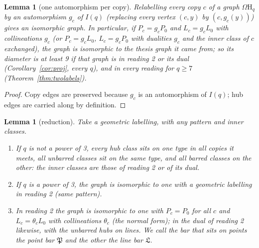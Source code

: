 \documentclass[11pt]{amsart}
\newtheorem{lemma}[theorem]{Lemma}
\theoremstyle{definition}
\theoremstyle{remark}
\numberwithin{equation}{section}
\newcommand{\Om}{\Omega\mathrm H}
\begin{document}
\begin{lemma}[one automorphism per copy]\label{lem:relabel}
Relabelling every copy $c$ of a graph $\Om_q$ by an automorphism $g_c$ of $I(q)$ (replacing every vertex $(c,y)$ by
$(c,g_c(y))$) gives an isomorphic graph. In particular, if $P_c=g_cP_0$ and $L_c=g_cL_0$ with collineations $g_c$ (or
$P_c=g_cL_0$, $L_c=g_cP_0$ with dualities $g_c$ and the inner class of $c$ exchanged), the graph is isomorphic to the thesis
graph it came from; so its diameter is at least 9 if that graph is in reading 2 or its dual (Corollary~\ref{cor:proj}, every
$q$), and in every reading for $q\ge7$ (Theorem~\ref{thm:twolabels}).
\end{lemma}

\begin{proof}
Copy edges are preserved because $g_c$ is an automorphism of $I(q)$; hub edges are carried along by definition.
\end{proof}

\begin{lemma}[reduction]\label{lem:reduction}
Take a geometric labelling, with any pattern and inner classes.
\begin{enumerate}[label=(\alph*)]
\item If $q$ is not a power of 3, every hub class sits on one type in all copies it meets, all unbarred classes sit on the
  same type, and all barred classes on the other: the inner classes are those of reading 2 or of its dual.
\item If $q$ is a power of 3, the graph is isomorphic to one with a geometric labelling in reading 2 (same pattern).
\item In reading 2 the graph is isomorphic to one with $P_c=P_0$ for all $c$ and $L_c=\theta_cL_0$ with collineations
  $\theta_c$ (the \emph{normal form}); in the dual of reading 2 likewise, with the unbarred hubs on lines. We call the bar
  that sits on points the \emph{point bar} $\mathfrak P$ and the other the \emph{line bar} $\mathfrak L$.
\end{enumerate}
\end{lemma}
\end{document}
